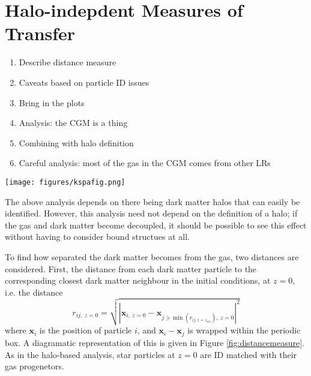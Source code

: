 \section{Halo-indepdent Measures of Transfer}

\begin{enumerate}
    \item Describe distance measure
    \item Caveats based on particle ID issues
    \item Bring in the plots
    \item Analysis: the CGM is a thing
    \item Combining with halo definition
    \item Careful analysis: most of the gas in the CGM comes from other LRs
\end{enumerate}

\begin{figure*}
    \centering
    \texttt{[image: figures/kspafig.png]}
    \caption{A diagramatic representation of the distance measure. On the left, the initial conditions are shown. The blue dark matter particles each find their closest dark matter and gas (red) neighbour. These particles are then tracked to the final state of the simulation (right) and the distances between them calculated again.}
    \label{fig:distancemeasure}
\end{figure*}

The above analysis depends on there being dark matter halos that can easily be identified. However, this analysis need not depend on the definition of a halo; if the gas and dark matter become decoupled, it should be possible to see this effect without having to consider bound structues at all.

To find how separated the dark matter becomes from the gas, two distances are considered. First, the distance from each dark matter particle to the corresponding closest dark matter neighbour in the initial conditions, at $z=0$, i.e. the distance
\begin{equation}
    r_{ij, ~z=0} = \sqrt{
        \left|
            \mathbf{x}_{i, ~z=0} - \mathbf{x}_{j \ni \min(r_{ij, z=z_{ini}}), ~z=0}
        \right|^2
    }
    \label{eqn:minimal}
\end{equation}
where $\mathbf{x}_i$ is the position of particle $i$, and $\mathbf{x}_i - \mathbf{x}_j$ is wrapped within the periodic box. A diagramatic representation of this is given in Figure \ref{fig:distancemeasure}. As in the halo-based analysis, star particles at $z=0$ are ID matched with their gas progenetors.

